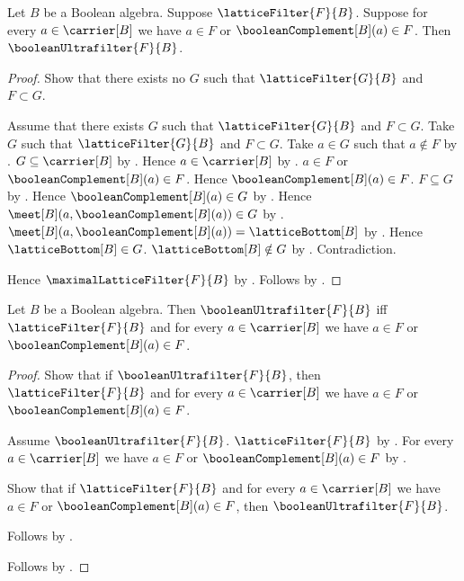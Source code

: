 \begin{theorem}\label{filter_and_decision_implies_boolean_ultrafilter}
    Let $B$ be a Boolean algebra.
    Suppose $\latticeFilter{F}{B}$.
    Suppose for every $a\in\carrier[B]$ we have
        $a\in F$ or $\booleanComplement[B](a)\in F$.
    Then $\booleanUltrafilter{F}{B}$.
\end{theorem}
\begin{proof}
    Show that there exists no $G$ such that
        $\latticeFilter{G}{B}$ and $F\subset G$.
    \begin{subproof}
        Assume that there exists $G$ such that
            $\latticeFilter{G}{B}$ and $F\subset G$.
        Take $G$ such that $\latticeFilter{G}{B}$ and $F\subset G$.
        Take $a\in G$ such that $a\notin F$ by
            .
        $G\subseteq\carrier[B]$ by
            .
        Hence $a\in\carrier[B]$ by .
        $a\in F$ or $\booleanComplement[B](a)\in F$.
        Hence $\booleanComplement[B](a)\in F$.
        $F\subseteq G$ by .
        Hence $\booleanComplement[B](a)\in G$ by .
        Hence $\meet[B](a,\booleanComplement[B](a))\in G$ by
            .
        $\meet[B](a,\booleanComplement[B](a))
            =\latticeBottom[B]$ by .
        Hence $\latticeBottom[B]\in G$.
        $\latticeBottom[B]\notin G$ by
            .
        Contradiction.
    \end{subproof}
    Hence $\maximalLatticeFilter{F}{B}$ by
        .
    Follows by .
\end{proof}

\begin{theorem}\label{boolean_ultrafilter_iff_filter_and_decision}
    Let $B$ be a Boolean algebra.
    Then $\booleanUltrafilter{F}{B}$ iff
        $\latticeFilter{F}{B}$ and
        for every $a\in\carrier[B]$ we have
            $a\in F$ or $\booleanComplement[B](a)\in F$.
\end{theorem}
\begin{proof}
    Show that if $\booleanUltrafilter{F}{B}$, then
        $\latticeFilter{F}{B}$ and
        for every $a\in\carrier[B]$ we have
            $a\in F$ or $\booleanComplement[B](a)\in F$.
    \begin{subproof}
        Assume $\booleanUltrafilter{F}{B}$.
        $\latticeFilter{F}{B}$ by
            .
        For every $a\in\carrier[B]$ we have
            $a\in F$ or $\booleanComplement[B](a)\in F$ by
            .
    \end{subproof}
    Show that if $\latticeFilter{F}{B}$ and
        for every $a\in\carrier[B]$ we have
            $a\in F$ or $\booleanComplement[B](a)\in F$, then
        $\booleanUltrafilter{F}{B}$.
    \begin{subproof}
        Follows by
            .
    \end{subproof}
    Follows by \auto.
\end{proof}

